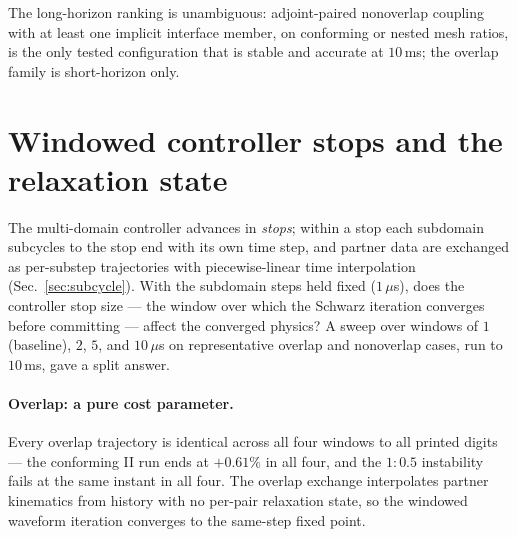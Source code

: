\documentclass[11pt]{article}
\begin{document}
The long-horizon ranking is unambiguous: adjoint-paired nonoverlap coupling
with at least one implicit interface member, on conforming or nested mesh
ratios, is the only tested configuration that is stable and accurate at $10$\,ms; the
overlap family is short-horizon only.

\section{Windowed controller stops and the relaxation state}
\label{sec:windowed}

The multi-domain controller advances in \emph{stops}; within a stop each
subdomain subcycles to the stop end with its own time step, and partner
data are exchanged as per-substep trajectories with piecewise-linear time
interpolation (Sec.~\ref{sec:subcycle}). With the subdomain steps held
fixed ($1\,\mu$s), does the controller stop size --- the window over which
the Schwarz iteration converges before committing --- affect the converged
physics? A sweep over windows of $1$ (baseline), $2$, $5$, and $10\,\mu$s
on representative overlap and nonoverlap cases, run to $10$\,ms, gave a
split answer.

\paragraph{Overlap: a pure cost parameter.} Every overlap trajectory is
identical across all four windows to all printed digits --- the conforming
II run ends at $+0.61\%$ in all four, and the $1{:}0.5$ instability
fails at the same instant in all four. The overlap exchange interpolates partner
kinematics from history with no per-pair relaxation state, so the windowed
waveform iteration converges to the same-step fixed point.
\end{document}
